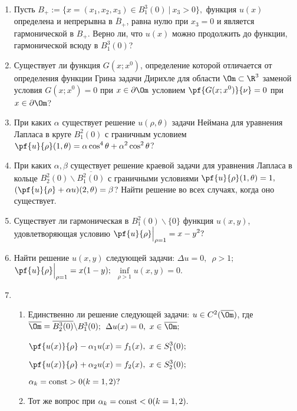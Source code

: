 \documentclass[a4paper]{article}
\def\a{\alpha}
\def\b{\beta}
\def\D{\Delta}
\begin{document}
\begin{enumerate}
\item
Пусть $B_+:=\{x=(x_1,x_2,x_3)\in B_1^3(0)\ |\ x_3>0\},$
функция $u(x)$ определена и непрерывна в $\overline B_+$, равна нулю при $x_3=0$
и является гармонической в $B_+$. Верно ли, что $u(x)$ можно продолжить до
функции, гармонической всюду в $B_1^3(0)$?

\item
Существует ли функция $G(x; x^0)$, определение которой отличается
от определения функции Грина задачи Дирихле для области $\Om\subset\R^3$
заменой условия $G(x;x^0) = 0$ при $x\in\partial\Om$ условием
$\displaystyle{\pf{G(x;x^0)}{\nu} = 0}$ при $x\in\partial\Om$?

\item
При каких $\a$ существует решение $u(\rho,\theta)$ задачи Неймана для
уравнения Лапласа в круге $B_1^2(0)$ с граничным условием
$\displaystyle{\pf{u}{\rho}}(1,\theta)=\a\cos^4\theta +\a^2\cos^2\theta$?

\item
При каких $\a,\b$ существует решение краевой задачи для уравнения
Лапласа в кольце $B_2^2(0)\backslash \overline{B_1^2(0)}$ с граничными
условиями
$\displaystyle{\pf{u}{\rho}}(1,\theta)=1,\ $
$\displaystyle{\left(\pf{u}{\rho}+\a u\right)}(2,\theta)=\b$?
Найти решение во всех случаях, когда оно существует.

\item
Существует ли гармоническая в $B_1^2(0)\backslash\{0\}$ функция $u(x,y)$,
удовлетворяющая условию $\displaystyle{\pf{u}{\rho}}\Big|_{\rho=1}=x-y^2?$

\item
Найти решение $u(x,y)$ следующей задачи: $\D u=0,$\ $\rho>1;$\
$\displaystyle{\pf{u}{\rho}}\Big|_{\rho=1}=x(1-y);$\ $\inf\limits_{\rho>1}
u(x,y)=0.$

\item
\begin{enumerate}
  \item
  Единственно ли решение следующей задачи: $u\in C^2(\overline\Om)$, где
  $\overline\Om=\overline{B_2^3(0)} \backslash B_1^3(0);$\
  $\D u(x)=0,\ x\in \overline\Om;$

  \noindent
  $\displaystyle{\pf{u(x)}{\rho}}-\a_1 u(x)=f_1(x),\ x\in S_1^3(0);$\

  \noindent
  $\displaystyle{\pf{u(x)}{\rho}}
  +\a_2 u(x)=f_2(x),\ x\in S_2^3(0);$

  \noindent
  $\a_k=\hbox{const}>0 (k=1,2)?$
  \item
  Тот же вопрос при $\a_k=\hbox{const}<0 (k=1,2).$
\end{enumerate}


\end{enumerate}
\end{document}
